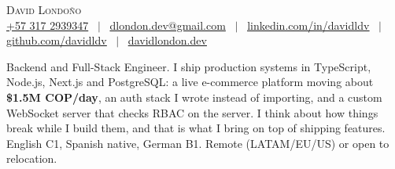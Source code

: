



\begin{center}
    {\Large \scshape David Londoño} \\[2mm]
    \vspace{-1pt}
    \footnotesize
    \underline{+57 317 2939347} ~$|$~
    \underline{dlondon.dev@gmail.com} ~$|$~
    \href{https://www.linkedin.com/in/davidldv/}{\underline{linkedin.com/in/davidldv}} ~$|$~
    \href{https://github.com/davidldv}{\underline{github.com/davidldv}} ~$|$~
    \href{https://davidlondon.dev/}{\underline{davidlondon.dev}}
    \vspace{-4pt}
\end{center}
\vspace{-1pt}
\small{
Backend and Full-Stack Engineer. I ship production systems in TypeScript, Node.js, Next.js and PostgreSQL: a live e-commerce platform moving about \textbf{\$1.5M COP/day}, an auth stack I wrote instead of importing, and a custom WebSocket server that checks RBAC on the server. I think about how things break while I build them, and that is what I bring on top of shipping features. English C1, Spanish native, German B1. Remote (LATAM/EU/US) or open to relocation.
}
\vspace{-6pt}
